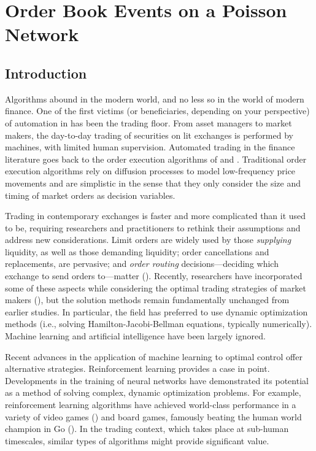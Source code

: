 \chapter{Order Book Events on a Poisson Network}
\label{chapter:four}


\section{Introduction}
	Algorithms abound in the modern world, and no less so in the world of modern finance. One of the first victims (or beneficiaries, depending on your perspective) of automation in has been the trading floor. From asset managers to market makers, the day-to-day trading of securities on lit exchanges is performed by machines, with limited human supervision. Automated trading in the finance literature goes back to the order execution algorithms of \cite{Almgren2000} and \cite{Bertsimas1998}. Traditional order execution algorithms rely on diffusion processes to model low-frequency price movements and are simplistic in the sense that they only consider the size and timing of market orders as decision variables.

	Trading in contemporary exchanges is faster and more complicated than it used to be, requiring researchers and practitioners to rethink their assumptions and address new considerations. Limit orders are widely used by those \textit{supplying} liquidity, as well as those demanding liquidity; order cancellations and replacements, are pervasive; and \textit{order routing} decisions---deciding which exchange to send orders to---matter (\cite{Cont2017}). Recently, researchers have incorporated some of these aspects while considering the optimal trading strategies of market makers (\cite{Guilbaud2013, Xu2015}), but the solution methods remain fundamentally unchanged from earlier studies. In particular, the field has preferred to use dynamic optimization methods (i.e., solving Hamilton-Jacobi-Bellman equations, typically numerically). Machine learning and artificial intelligence have been largely ignored.

	Recent advances in the application of machine learning to optimal control offer alternative strategies. Reinforcement learning provides a case in point. Developments in the training of neural networks have demonstrated its potential as a method of solving complex, dynamic optimization problems. For example, reinforcement learning algorithms have achieved world-class performance in a variety of video games (\cite{Mnih2015}) and board games, famously beating the human world champion in Go (\cite{Silver2017}). In the trading context, which takes place at sub-human timescales, similar types of algorithms might provide significant value.

